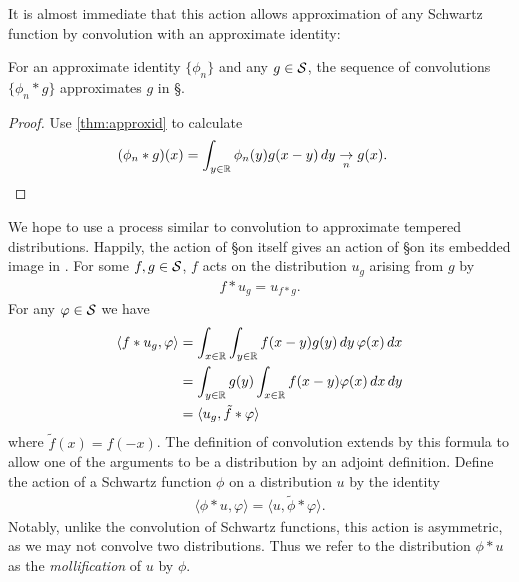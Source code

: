     It is almost immediate that this action allows approximation of any Schwartz function by convolution with an approximate identity:
    \begin{lemma}
      \label{lemma:approxbyconv}
      For an approximate identity $\{\phi_n\}$ and any $g\in\S$, the sequence of convolutions $\{\phi_n*g\}$ approximates $g$ in \S.
    \end{lemma}
    \begin{proof}
      Use \cref{thm:approxid} to calculate
      \begin{align*}
        (\phi_n*g)(x)
        &= \int_{y\in\R} \phi_n(y)g(x-y)\,dy
        \underset{n}{\rightarrow} g(x) \text{.}
      \end{align*}
    \end{proof}

    We hope to use a process similar to convolution to approximate tempered distributions.
    Happily, the action of \S on itself gives an action of \S on its embedded image in \SS.
    For some $f,g\in\S$, $f$ acts on the distribution $u_g$ arising from $g$ by
    \begin{align*}
      f*u_g = u_{f*g} \text{.}
    \end{align*}
    For any $\varphi\in\S$ we have
    \begin{align*}
      \langle f*u_g, \varphi\rangle
      &= \int_{x\in\R} \int_{y\in\R} f(x-y)g(y)\,dy\,\varphi(x)\,dx
      \\&= \int_{y\in\R} g(y) \int_{x\in\R} f(x-y)\varphi(x)\,dx\,dy
      \\&= \langle u_g, \tilde f*\varphi\rangle
    \end{align*}
    where $\tilde f(x) = f(-x)$.
    The definition of convolution extends by this formula to allow one of the arguments to be a distribution by an adjoint definition.
    Define the action of a Schwartz function $\phi$ on a distribution $u$ by the identity
    \begin{align*}
      \langle \phi*u, \varphi\rangle
      = \langle u, \tilde\phi*\varphi\rangle \text{.}
    \end{align*}
    Notably, unlike the convolution of Schwartz functions, this action is asymmetric, as we may not convolve two distributions.
    Thus we refer to the distribution $\phi*u$ as the \emph{mollification} of $u$ by $\phi$.

